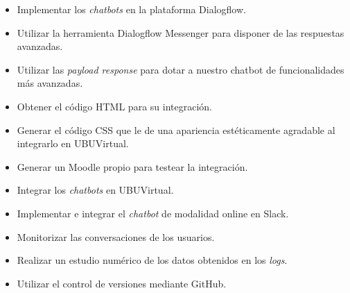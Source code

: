 \begin{itemize}
	\tightlist 
	\item
	Implementar los \emph{chatbots} en la plataforma Dialogflow.
	\item
	Utilizar la herramienta Dialogflow Messenger para disponer de las respuestas avanzadas.
	\item 
	Utilizar las \emph{payload response} para dotar a nuestro chatbot de funcionalidades más avanzadas.
	\item
	Obtener el código HTML para su integración.
	\item
	Generar el código CSS que le de una apariencia estéticamente agradable al integrarlo en UBUVirtual.
	\item
	Generar un Moodle propio para testear la integración.
	\item
	Integrar los \emph{chatbots} en UBUVirtual.
	\item
	Implementar e integrar el \emph{chatbot} de modalidad online en Slack.
	\item
	Monitorizar las conversaciones de los usuarios.
	\item
	Realizar un estudio numérico de los datos obtenidos en los \textit{logs}.
	\item
	Utilizar el control de versiones mediante GitHub.
	
	
	
\end{itemize}